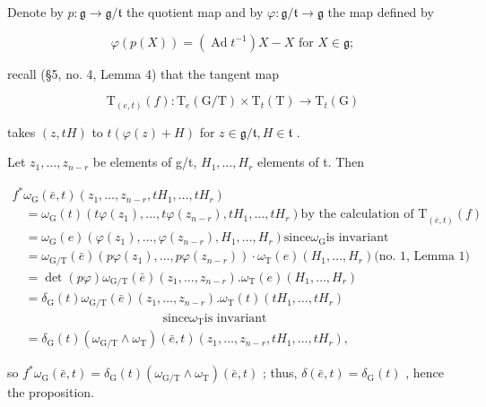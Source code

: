 Denote by \(p:\mathfrak{g}\to \mathfrak{g} / \mathfrak{t}\) the quotient map and by \(\varphi :\mathfrak{g} / \mathfrak{t}\rightarrow \mathfrak{g}\) the map defined by

\[
\varphi (p (X)) = (\operatorname{Ad} t ^ {- 1}) X - X \text { for } X \in \mathfrak {g};
\]

recall (§5, no. 4, Lemma 4) that the tangent map

\[
\mathrm{T} _ {(e, t)} (f): \mathrm{T} _ {e} (\mathrm{G} / \mathrm{T}) \times \mathrm{T} _ {t} (\mathrm{T}) \to \mathrm{T} _ {t} (\mathrm{G})
\]

takes \((z,tH)\) to \(t(\varphi (z) + H)\) for \(z\in \mathfrak{g} / \mathfrak{t},H\in \mathfrak{t}\) .

Let \(z_{1},\ldots,z_{n-r}\) be elements of g/t, \(H_{1},\ldots,H_{r}\) elements of t. Then

\[
\begin{array}{l} f ^ {*} \omega_ {\mathrm{G}} (\bar {e}, t) (z _ {1}, \ldots , z _ {n - r}, t H _ {1}, \ldots , t H _ {r}) \\ \quad = \omega_ {\mathrm{G}} (t) (t \varphi (z _ {1}), \ldots , t \varphi (z _ {n - r}), t H _ {1}, \ldots , t H _ {r}) \text {by the calculation of T} _ {(\bar {e}, t)} (f) \\ \quad = \omega_ {\mathrm{G}} (e) (\varphi (z _ {1}), \ldots , \varphi (z _ {n - r}), H _ {1}, \ldots , H _ {r}) \text {since} \omega_ {\mathrm{G}} \text {is invariant} \\ \quad = \omega_ {\mathrm{G/T}} (\bar {e}) (p \varphi (z _ {1}), \ldots , p \varphi (z _ {n - r})) \cdot \omega_ {\mathrm{T}} (e) (H _ {1}, \ldots , H _ {r}) \text {(no. 1, Lemma 1)} \\ \quad = \det (p \varphi) \omega_ {\mathrm{G/T}} (\bar {e}) (z _ {1}, \ldots , z _ {n - r}). \omega_ {\mathrm{T}} (e) (H _ {1}, \ldots , H _ {r}) \\ \quad = \delta_ {\mathrm{G}} (t) \omega_ {\mathrm{G/T}} (\bar {e}) (z _ {1}, \ldots , z _ {n - r}). \omega_ {\mathrm{T}} (t) (t H _ {1}, \ldots , t H _ {r}) \\ \qquad \qquad \qquad \qquad \qquad \qquad \text {since} \omega_ {\mathrm{T}} \text {is invariant} \\ \quad = \delta_ {\mathrm{G}} (t) (\omega_ {\mathrm{G/T}} \wedge \omega_ {\mathrm{T}}) (\bar {e}, t) (z _ {1}, \ldots , z _ {n - r}, t H _ {1}, \ldots , t H _ {r}), \end{array}
\]

so \(f^{*}\omega_{\mathrm{G}}(\bar{e},t) = \delta_{\mathrm{G}}(t)(\omega_{\mathrm{G / T}}\wedge \omega_{\mathrm{T}})(\bar{e},t)\) ; thus, \(\delta (\bar {e},t) = \delta_{\mathrm{G}}(t)\) , hence the proposition.

